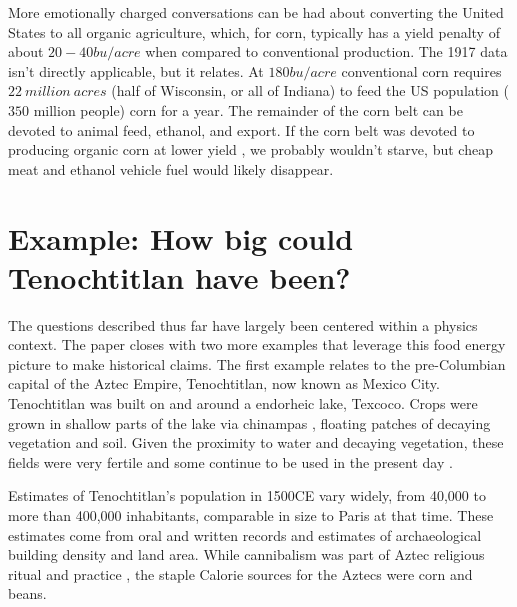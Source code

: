 \documentclass[12pt]{iopart}
\begin{document}
%
%
More emotionally charged conversations can be had about converting the United States to all organic agriculture, which, for corn, typically has a yield penalty of about $20-40bu/acre$ when compared to conventional production.  The 1917 data isn't directly applicable, but it relates. At $180bu/acre$ conventional corn requires $22~million~acres$ (half of Wisconsin, or all of Indiana) to feed the US population ($350$ million people) corn for a year.  The remainder of the corn belt can be devoted to animal feed, ethanol, and export.  If the corn belt was devoted to producing organic corn at lower yield \cite{organic_corn_yield}, we probably wouldn't starve, but cheap meat and ethanol vehicle fuel would likely disappear.   
%

\clearpage

\section{Example: How big could Tenochtitlan have been?}
The questions described thus far have largely been centered within a physics context.  The paper closes with two more examples that leverage this food energy picture to make historical claims.  The first example relates to the pre-Columbian capital of the Aztec Empire, Tenochtitlan, now known as Mexico City.  Tenochtitlan was built on and around a endorheic lake, Texcoco.  Crops were grown in shallow parts of the lake via chinampas \cite{national_geo}, floating patches of decaying vegetation and soil.  Given the proximity to water and decaying vegetation, these fields were very fertile \cite{HortTech_2019,Chinampas_1964} and some continue to be used in the present day \cite{google_earth}.  


Estimates of Tenochtitlan's population in 1500CE vary widely, from 40,000 \cite{40k} to more than 400,000 \cite{400k} inhabitants, comparable in size to Paris at that time. These estimates come from oral and written records and estimates of archaeological building density and land area.   While cannibalism was part of Aztec religious ritual and practice \cite{Aztec_Cannibalism}, the staple Calorie sources for the Aztecs were corn and beans.
\end{document}
